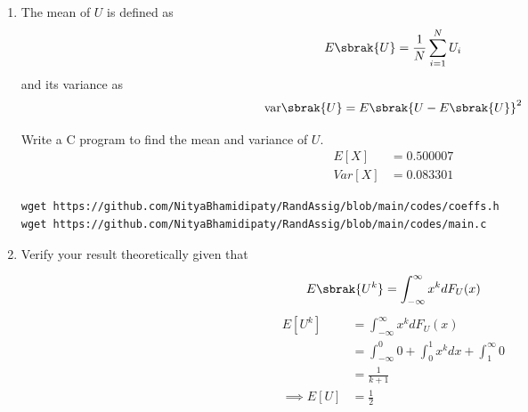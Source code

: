 \documentclass[journal,12pt,twocolumn]{IEEEtran}
\renewcommand\thesection{\arabic{section}}
\begin{document}
\begin{enumerate}[label=\thesection.\arabic*
,ref=\thesection.\theenumi]
\begin{align}
    F_U(x) &= \int_{-\infty}^{x}f_U(u)dx\\
        &= \int_{-\infty}^{x}1dx\\
        &= x
\end{align}
if $x \ge 1$
\begin{align}
    F_U(x) &= \int_{-\infty}^{x}f_U(u)dx\\
        &= \int_{-\infty}^{x}0dx\\
        &= 0
\end{align}
Hence,
\begin{align}
    F_U(x) &= \begin{cases}
     0 & x\le0\\
     x & x\in(0,1)\\
     1 & x\ge1
    \end{cases}
\end{align}
\item
The mean of $U$ is defined as
%
\begin{equation}
E\sbrak{U} = \frac{1}{N}\sum_{i=1}^{N}U_i
\end{equation}
%
and its variance as
%
\begin{equation}
\text{var}\sbrak{U} = E\sbrak{U- E\sbrak{U}}^2 
\end{equation}

Write a C program to  find the mean and variance of $U$. 
\\
\solution
\begin{align}
    E[X] &= 0.500007\\
    Var[X] &= 0.083301
\end{align}
\begin{lstlisting}
wget https://github.com/NityaBhamidipaty/RandAssig/blob/main/codes/coeffs.h  
wget https://github.com/NityaBhamidipaty/RandAssig/blob/main/codes/main.c
\end{lstlisting}

\item Verify your result theoretically given that

\begin{equation}
E\sbrak{U^k} = \int_{-\infty}^{\infty}x^kdF_{U}(x)
\end{equation}
\solution
\begin{align}
    E[U^k] &= \int_{-\infty}^{\infty} x^k dF_U(x)\\
            &= \int_{-\infty}^{0} 0 + \int_{0}^{1}x^kdx + \int_1^{\infty}0\\
            &= \frac{1}{k+1}\\
    \implies E[U] &= \frac{1}{2}
\end{align}
%
\end{enumerate}
\end{document}
